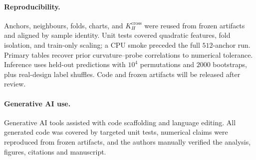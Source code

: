 \documentclass{article}
\begin{document}
\paragraph{Reproducibility.}
Anchors, neighbours, folds, charts, and $K_H^{\mathrm{cross}}$ were reused from frozen artifacts and aligned by sample identity.
Unit tests covered quadratic features, fold isolation, and train-only scaling; a CPU smoke preceded the full $512$-anchor run.
Primary tables recover prior curvature--probe correlations to numerical tolerance.
Inference uses held-out predictions with $10^4$ permutations and $2000$ bootstraps, plus real-design label shuffles.
Code and frozen artifacts will be released after review.

\paragraph{Generative AI use.}
Generative AI tools assisted with code scaffolding and language editing.
All generated code was covered by targeted unit tests, numerical claims were reproduced from frozen artifacts, and the authors manually verified the analysis, figures, citations and manuscript.



\end{document}

